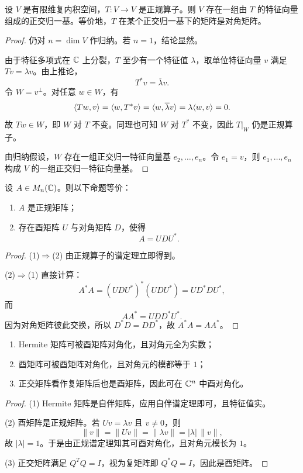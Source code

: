 \begin{theorem}[正规算子的谱定理]
设 $V$ 是有限维复内积空间，$T:V\to V$ 是正规算子。则 $V$ 存在一组由 $T$ 的特征向量组成的正交归一基。等价地，$T$ 在某个正交归一基下的矩阵是对角矩阵。
\end{theorem}

\begin{proof}
仍对 $n=\dim V$ 作归纳。若 $n=1$，结论显然。

由于特征多项式在 $\mathbb{C}$ 上分裂，$T$ 至少有一个特征值 $\lambda$，取单位特征向量 $v$ 满足 $Tv=\lambda v$。由上推论，
\[
T^*v=\overline{\lambda}v.
\]
令 $W=v^{\perp}$。对任意 $w\in W$，有
\[
\langle Tw, v \rangle=\langle w, T^*v \rangle=\langle w, \overline{\lambda}v \rangle=\lambda\langle w, v \rangle=0.
\]
故 $Tw\in W$，即 $W$ 对 $T$ 不变。同理也可知 $W$ 对 $T^*$ 不变，因此 $T|_W$ 仍是正规算子。

由归纳假设，$W$ 存在一组正交归一特征向量基 $e_2,\dots,e_n$。令 $e_1=v$，则 $e_1,\dots,e_n$ 构成 $V$ 的一组正交归一特征向量基。
\end{proof}

\begin{corollary}
设 $A\in M_n(\mathbb{C})$。则以下命题等价：
\begin{enumerate}[label=\textnormal{(\arabic*)}]
  \item $A$ 是正规矩阵；
  \item 存在酉矩阵 $U$ 与对角矩阵 $D$，使得
  \[
  A=UDU^*.
  \]
\end{enumerate}
\end{corollary}

\begin{proof}
(1)$\Rightarrow$(2) 由正规算子的谱定理立即得到。

(2)$\Rightarrow$(1) 直接计算：
\[
A^*A=(UDU^*)^*(UDU^*)=UD^*DU^*,
\]
而
\[
AA^*=UDD^*U^*.
\]
因为对角矩阵彼此交换，所以 $D^*D=DD^*$，故 $A^*A=AA^*$。
\end{proof}

\begin{corollary}
\begin{enumerate}[label=\textnormal{(\arabic*)}]
  \item Hermite 矩阵可被酉矩阵对角化，且对角元全为实数；
  \item 酉矩阵可被酉矩阵对角化，且对角元的模都等于 $1$；
  \item 正交矩阵看作复矩阵后也是酉矩阵，因此可在 $\mathbb{C}^n$ 中酉对角化。
\end{enumerate}
\end{corollary}

\begin{proof}
(1) Hermite 矩阵是自伴矩阵，应用自伴谱定理即可，且特征值实。

(2) 酉矩阵是正规矩阵。若 $Uv=\lambda v$ 且 $v\ne0$，则
\[
\|v\|=\|Uv\|=\|\lambda v\|=|\lambda|\,\|v\|,
\]
故 $|\lambda|=1$。于是由正规谱定理知其可酉对角化，且对角元模长为 $1$。

(3) 正交矩阵满足 $Q^TQ=I$，视为复矩阵即 $Q^*Q=I$，因此是酉矩阵。
\end{proof}

